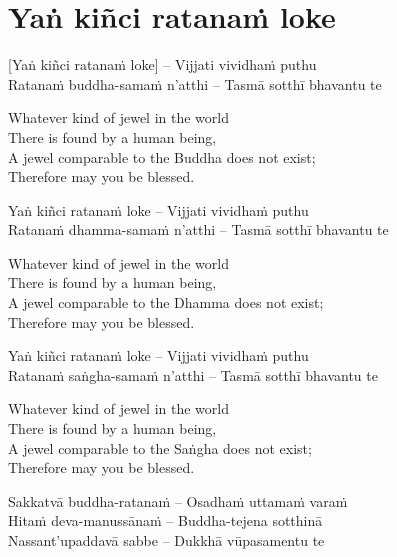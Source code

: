 \suttaRef{[SN 11.3]}

\section{Yaṅ kiñci ratanaṁ loke}
\label{yan-kinci-ratanam-loke}

\vspace{-0.6em}

[Yaṅ kiñci ratanaṁ loke] – Vijjati vividhaṁ puthu\\
Ratanaṁ buddha-samaṁ n'atthi – Tasmā sotthī bhavantu te

\begin{english-verses}
  Whatever kind of jewel in the world\\
  There is found by a human being,\\
  A jewel comparable to the Buddha does not exist;\\
  Therefore may you be blessed.
\end{english-verses}

Yaṅ kiñci ratanaṁ loke – Vijjati vividhaṁ puthu\\
Ratanaṁ dhamma-samaṁ n'atthi – Tasmā sotthī bhavantu te

\begin{english-verses}
  Whatever kind of jewel in the world\\
  There is found by a human being,\\
  A jewel comparable to the Dhamma does not exist;\\
  Therefore may you be blessed.
\end{english-verses}

Yaṅ kiñci ratanaṁ loke – Vijjati vividhaṁ puthu\\
Ratanaṁ saṅgha-samaṁ n'atthi – Tasmā sotthī bhavantu te

\begin{english-verses}
  Whatever kind of jewel in the world\\
  There is found by a human being,\\
  A jewel comparable to the Saṅgha does not exist;\\
  Therefore may you be blessed.
\end{english-verses}

Sakkatvā buddha-ratanaṁ – Osadhaṁ\hyperlink{endnote124-appendix}{\hypertarget{endnote124-body}{}}
uttamaṁ varaṁ\\
Hitaṁ deva-manussānaṁ – Buddha-tejena sotthinā\\
Nassant'upaddavā sabbe – Dukkhā vūpasamentu te

